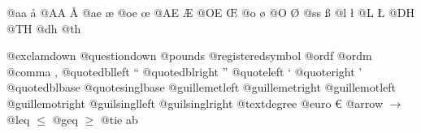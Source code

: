 \documentclass{book}
\begin{document}
@aa \aa{}
@AA \AA{}
@ae \ae{}
@oe \oe{}
@AE \AE{}
@OE \OE{}
@o \o{}
@O \O{}
@ss \ss{}
@l \l{}
@L \L{}
@DH \DH{}
@TH \TH{}
@dh \dh{}
@th \th{}

@exclamdown \textexclamdown{}
@questiondown \textquestiondown{}
@pounds \textsterling{}
@registeredsymbol \circledR{}
@ordf \textordfeminine{}
@ordm \textordmasculine{}
@comma ,
@quotedblleft \textquotedblleft{}
@quotedblright \textquotedblright{}
@quoteleft \textquoteleft{}
@quoteright \textquoteright{}
@quotedblbase \quotedblbase{}
@quotesinglbase \quotesinglbase{}
@guillemetleft \guillemotleft{}
@guillemetright \guillemotright{}
@guillemotleft \guillemotleft{}
@guillemotright \guillemotright{}
@guilsinglleft \guilsinglleft{}
@guilsinglright \guilsinglright{}
@textdegree \textdegree{}
@euro \euro{}
@arrow $\rightarrow{}$
@leq $\leq{}$
@geq $\geq{}$
@tie a\hbox{}b
\end{document}
